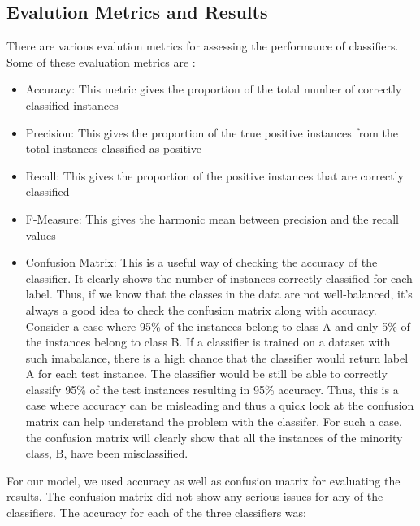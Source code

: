 \documentclass[sigconf]{acmart}
\begin{document}
\subsection{Evalution Metrics and Results}
There are various evalution metrics for assessing the performance of classifiers. Some of these evaluation metrics are \cite{hossin2015review}:
\begin{itemize}
	\item Accuracy: This metric gives the proportion of the total number of correctly classified instances
	\item Precision: This gives the proportion of the true positive instances from the total instances classified as positive
	\item Recall: This gives the proportion of the positive instances that are correctly classified
	\item F-Measure: This gives the harmonic mean between precision and the recall values
	\item Confusion Matrix: This is a useful way of checking the accuracy of the classifier. It clearly shows the number of instances correctly classified for each label. Thus, if we know that the classes in the data are not well-balanced, it's always a good idea to check the confusion matrix along with accuracy. Consider a case where 95\% of the instances belong to class A and only 5\% of the instances belong to class B. If a classifier is trained on a dataset with such imabalance, there is a high chance that the classifier would return label A for each test instance. The classifier would be still be able to correctly classify 95\% of the test instances resulting in 95\% accuracy. Thus, this is a case where accuracy can be misleading and thus a quick look at the confusion matrix can help understand the problem with the classifer. For such a case, the confusion matrix will clearly show that all the instances of the minority class, B, have been misclassified.
\end{itemize}

For our model, we used accuracy as well as confusion matrix for evaluating the results. The confusion matrix did not show any serious issues for any of the classifiers. The accuracy for each of the three classifiers was:
\end{document}
